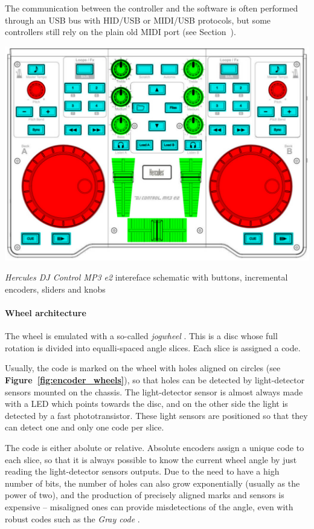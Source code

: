\documentclass[a4paper,10pt]{article}
\makeatletter
\newenvironment{figurehere}{\def\@captype{figure}\vspace{2ex}}{\vspace{2ex}}
\makeatother
\begin{document}
\begin{multicols}{2}
The communication between the controller and the software is often performed
through an USB bus with HID/USB or MIDI/USB protocols, but some controllers
still rely on the plain old MIDI port (see Section~\CITEME).

\begin{figurehere}
	\label{fig:hercules_mp3e2_schematic}
	\centering
	\includegraphics[keepaspectratio=true,width=\columnwidth]{images/hercules_mp3e2_schematic.pdf}
	\caption{\emph{Hercules DJ Control MP3 e2}\cite{hercules_djcmp3e2}
	intereface schematic with buttons, incremental encoders, sliders and knobs}
\end{figurehere}


\paragraph{Wheel architecture}
The wheel is emulated with a so-called \emph{jogwheel} \INSFIG. This is a disc
whose full rotation is divided into equalli-spaced angle slices. Each slice is
assigned a code.

Usually, the code is marked on the wheel with holes aligned on circles (see
\textbf{Figure~\ref{fig:encoder_wheels}}), so that holes can be detected by
light-detector sensors mounted on the chassis. The light-detector sensor is
almost always made with a LED which points towards the disc, and on the other
side the light is detected by a fast phototransistor. These light sensors are
positioned so that they can detect one and only one code per slice.

The code is either abolute or relative. Absolute encoders assign a unique code
to each slice, so that it is always possible to know the current wheel angle
by just reading the light-detector sensors outputs. Due to the need to have a
high number of bits, the number of holes can also grow exponentially (usually
as the power of two), and the production of precisely aligned marks and
sensors is expensive -- misaligned ones can provide misdetections of the
angle, even with robust codes such as the \emph{Gray code} \CITEME.


\end{multicols}
\end{document}
